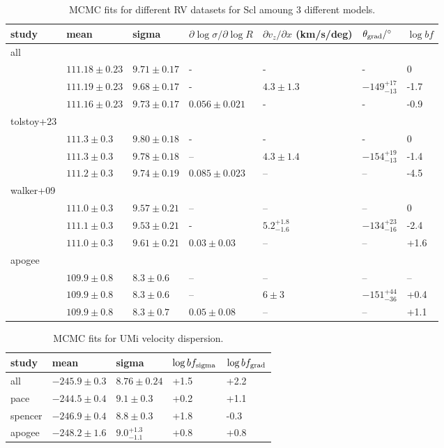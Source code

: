 \begin{table*}[t]
\centering
\caption{MCMC fits for different RV datasets for Scl amoung 3 different models.}
\label{tbl:MCMC-fits-for-different-RV-datasets-for-Scl-amoung-3-different-models}
\begin{tabular}{lllllll}
\toprule
study & mean & sigma & $\partial \log\sigma / \partial \log R$ & $\partial v_z / \partial x$ (km/s/deg) & $\theta_{\rm grad} / ^{\circ}$ & $\log bf$\\
\midrule
all &  &  &  &  &  & \\
 & $111.18\pm0.23$ & $9.71\pm0.17$ & - & - & - & 0\\
 & $111.19 \pm 0.23$ & $9.68\pm0.17$ & - & $4.3\pm1.3$ & $-149_{-13}^{+17}$ & -1.7\\
 & $111.16\pm0.23$ & $9.73\pm0.17$ & $0.056\pm0.021$ & - & - & -0.9\\
tolstoy+23 &  &  &  &  &  & \\
 & $111.3 \pm 0.3$ & $9.80 \pm 0.18$ & - & - & - & 0\\
 & $111.3\pm0.3$ & $9.78\pm0.18$ & – & $4.3\pm1.4$ & $-154_{-13}^{+19}$ & -1.4\\
 & $111.2 \pm 0.3$ & $9.74\pm0.19$ & $0.085 \pm 0.023$ & – & – & -4.5\\
walker+09 &  &  &  &  &  & \\
 & $111.0\pm0.3$ & $9.57\pm0.21$ & – & – & – & 0\\
 & $111.1\pm0.3$ & $9.53\pm0.21$ & - & $5.2_{-1.6}^{+1.8}$ & $-134_{-16}^{+23}$ & -2.4\\
 & $111.0\pm0.3$ & $9.61\pm0.21$ & $0.03\pm0.03$ & – & – & +1.6\\
apogee &  &  &  &  &  & \\
 & $109.9\pm0.8$ & $8.3\pm0.6$ & – & – & – & –\\
 & $109.9\pm0.8$ & $8.3\pm0.6$ & – & $6\pm3$ & $-151_{-36}^{+44}$ & +0.4\\
 & $109.9\pm0.8$ & $8.3\pm0.7$ & $0.05\pm0.08$ & – & – & +1.1\\
\bottomrule
\end{tabular}
\end{table*}

\begin{table*}[t]
\centering
\caption{MCMC fits for UMi velocity dispersion.}
\label{tbl:MCMC-fits-for-UMi-velocity-dispersion}
\begin{tabular}{lllll}
\toprule
study & mean & sigma & $\log bf_{\rm sigma}$ & $\log bf_{\rm grad}$\\
\midrule
all & $-245.9\pm0.3$ & $8.76\pm0.24$ & +1.5 & +2.2\\
pace & $-244.5\pm0.4$ & $9.1\pm0.3$ & +0.2 & +1.1\\
spencer & $-246.9\pm0.4$ & $8.8\pm0.3$ & +1.8 & -0.3\\
apogee & $-248.2\pm1.6$ & $9.0_{-1.1}^{+1.3}$ & +0.8 & +0.8\\
\bottomrule
\end{tabular}
\end{table*}


